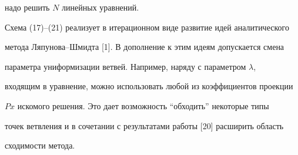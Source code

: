 надо решить $N$ линейных уравнений.





Схема (17)--(21) реализует в итерационном виде развитие идей аналитического


метода Ляпунова--Шмидта [1]. В дополнение к этим идеям допускается смена


параметра униформизации ветвей. Например, наряду с параметром  $\lambda$,


входящим в уравнение, можно использовать любой из коэффициентов проекции


$Px$ искомого решения. Это дает возможность ``обходить'' некоторые типы


точек ветвления и в сочетании с результатами работы [20] расширить область


сходимости метода.








